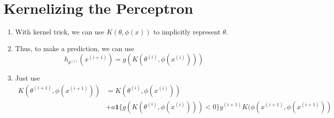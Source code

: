 \documentclass[12pt]{article}
\begin{document}
    \section*{Kernelizing the Perceptron}
    \begin{enumerate}[label=(\alph*)]
        \item With kernel trick, we can use $K(\theta,\phi(x))$ to implicitly represent $\theta$.
        \item Thus, to make a prediction, we can use 
        $$h_{\theta^{(i)}}(x^{(i+1)}) = g(K(\theta^{(i)},\phi(x^{(i)})))$$
        \item Just use
        \begin{equation*}
            \begin{split}
            K(\theta^{(i+1)},\phi(x^{(i+1)})) &= K(\theta^{(i)},\phi(x^{(i)})) \\
            &+  a\boldsymbol{1}\{g(K(\theta^{(i)},\phi(x^{(i)})))<0\}y^{(i+1)}K(\phi(x^{(i+1)},\phi(x^{(i+1)}))
            \end{split}
        \end{equation*}
    \end{enumerate}
\end{document}
